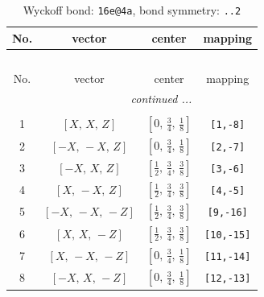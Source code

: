 \documentclass[fleqn,8pt]{jsarticle}
\begin{document}
\begin{longtable}{cccc}
\caption{Wyckoff bond: {\tt 16e@4a}, bond symmetry: {\tt ..2}}
 \\
 \hline \hline
No. & vector & center & mapping \\ \hline \endfirsthead

\multicolumn{3}{l}{\tablename\ \thetable{}} \\
 \hline \hline
No. & vector & center & mapping \\ \hline \endhead

 \hline \hline
\multicolumn{3}{r}{\footnotesize\it continued ...} \\ \endfoot

 \hline \hline
\multicolumn{3}{r}{} \\ \endlastfoot

1 & $\left[ X,\, X,\, Z \right]$ & $\left[ 0,\, \frac{3}{4},\, \frac{1}{8} \right]$ & {\tt [1,-8]} \\ \hline
2 & $\left[ - X,\, - X,\, Z \right]$ & $\left[ 0,\, \frac{3}{4},\, \frac{1}{8} \right]$ & {\tt [2,-7]} \\ \hline
3 & $\left[ - X,\, X,\, Z \right]$ & $\left[ \frac{1}{2},\, \frac{3}{4},\, \frac{3}{8} \right]$ & {\tt [3,-6]} \\ \hline
4 & $\left[ X,\, - X,\, Z \right]$ & $\left[ \frac{1}{2},\, \frac{3}{4},\, \frac{3}{8} \right]$ & {\tt [4,-5]} \\ \hline
5 & $\left[ - X,\, - X,\, - Z \right]$ & $\left[ \frac{1}{2},\, \frac{3}{4},\, \frac{3}{8} \right]$ & {\tt [9,-16]} \\ \hline
6 & $\left[ X,\, X,\, - Z \right]$ & $\left[ \frac{1}{2},\, \frac{3}{4},\, \frac{3}{8} \right]$ & {\tt [10,-15]} \\ \hline
7 & $\left[ X,\, - X,\, - Z \right]$ & $\left[ 0,\, \frac{3}{4},\, \frac{1}{8} \right]$ & {\tt [11,-14]} \\ \hline
8 & $\left[ - X,\, X,\, - Z \right]$ & $\left[ 0,\, \frac{3}{4},\, \frac{1}{8} \right]$ & {\tt [12,-13]} \\
\end{longtable}
\renewcommand{\arraystretch}{1.2}
\end{document}
